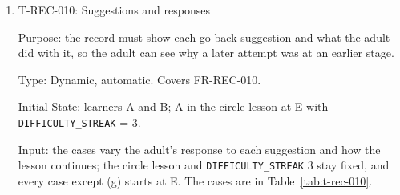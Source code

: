 \documentclass[12pt, titlepage]{article}
\newcommand{\testitem}[1]{\item #1\par\nopagebreak}
\begin{document}
\begin{enumerate}
Output: the expected output of each step is in its row of
Table~\ref{tab:t-rec-009}; the test passes when every step gives it.

Test Case Derivation: the fit criterion changes every adult-set value, a
starting stage and the other settings (SRS UC-010), and adds a lesson to
and removes a lesson from the catalogue. (e) is a catalogue edit (SRS
LC-001) that could re-score old attempts. The edit is to the square lesson,
whose record (2) has ended, so it cannot change record (4), a circle
lesson. In (g), the record of a lesson that has not ended may still grow.
Record (4) holds one failure before (g), so (g) gives no suggestion at
either end of the
\texttt{DIFFICULTY\_STREAK} range. (h) tries the direct route; its audit
event is tested by T-SEC-003. The steps follow H-MUH-007 (d).

How test will be performed: a Playwright script runs the steps and
recomputes the hashes from the database. Until the
\texttt{LESSON\_IDLE\_PROMPT} and \texttt{LESSON\_IDLE\_END} ranges are
set, those two values keep their defaults in the seed and in (a). Until the
SRS defines the accessibility settings, (c) changes only audio and
refinement.

\testitem{T-REC-010: Suggestions and responses}

Purpose: the record must show each go-back suggestion and what the adult
did with it, so the adult can see why a later attempt was at an earlier
stage.

Type: Dynamic, automatic. Covers FR-REC-010.

Initial State: learners A and B; A in the circle lesson at E with
\texttt{DIFFICULTY\_STREAK} = 3.

Input: the cases vary the adult's response to each suggestion and how the
lesson continues; the circle lesson and \texttt{DIFFICULTY\_STREAK} 3 stay
fixed, and every case except (g) starts at E. The cases are in
Table~\ref{tab:t-rec-010}.


\end{enumerate}
\end{document}
